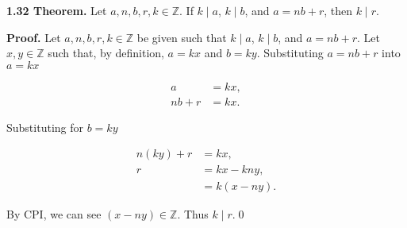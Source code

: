 \documentclass[12pt]{article}
\begin{document}
\noindent\textbf{1.32 Theorem.} Let $a,n,b,r,k\in\mathbb{Z}$. If $k\mid a$, $k\mid b$, and $a=nb+r$, then $k\mid r$.

\bigskip

\noindent\textbf{Proof.} Let $a,n,b,r,k\in\mathbb{Z}$ be given such that $k\mid a$, $k\mid b$, and $a=nb+r$. Let $x,y\in\mathbb{Z}$ such that, by definition, $a=kx$ and $b=ky$. Substituting $a=nb+r$ into $a=kx$

\begin{align*}
a &= kx, \\
nb+r &= kx.
\end{align*}

\noindent Substituting for $b=ky$

\begin{align*}
n(ky)+r &= kx, \\
r &= kx-kny, \\
&= k(x-ny).
\end{align*}

By CPI, we can see $(x-ny)\in\mathbb{Z}$. Thus $k\mid r$.\qed
\end{document}
